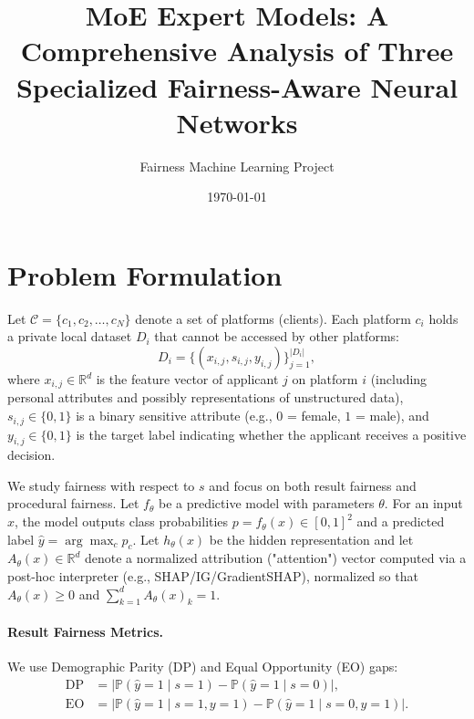 \documentclass[11pt]{article}
\title{MoE Expert Models: A Comprehensive Analysis of Three Specialized Fairness-Aware Neural Networks}
\author{Fairness Machine Learning Project}
\date{\today}
\begin{document}
\maketitle

\section{Problem Formulation}

Let $\mathcal{C} = \{c_1, c_2, \dots, c_N\}$ denote a set of platforms (clients). Each platform $c_i$ holds a private local dataset $D_i$ that cannot be accessed by other platforms:
\begin{equation}
    D_i = \{(x_{i,j}, s_{i,j}, y_{i,j})\}_{j=1}^{|D_i|},
\end{equation}
where $x_{i,j} \in \mathbb{R}^d$ is the feature vector of applicant $j$ on platform $i$ (including personal attributes and possibly representations of unstructured data), $s_{i,j} \in \{0,1\}$ is a binary sensitive attribute (e.g., $0$ = female, $1$ = male), and $y_{i,j} \in \{0,1\}$ is the target label indicating whether the applicant receives a positive decision.

We study fairness with respect to $s$ and focus on both result fairness and procedural fairness. Let $f_\theta$ be a predictive model with parameters $\theta$. For an input $x$, the model outputs class probabilities $p = f_\theta(x) \in [0,1]^2$ and a predicted label $\hat{y} = \arg\max_c p_c$. Let $h_\theta(x)$ be the hidden representation and let $A_\theta(x) \in \mathbb{R}^d$ denote a normalized attribution ("attention") vector computed via a post-hoc interpreter (e.g., SHAP/IG/GradientSHAP), normalized so that $A_\theta(x) \ge 0$ and $\sum_{k=1}^d A_\theta(x)_k = 1$.

\paragraph{Result Fairness Metrics.} We use Demographic Parity (DP) and Equal Opportunity (EO) gaps:
\begin{align}
    \text{DP} &= \left| \mathbb{P}(\hat{y}=1\mid s=1) - \mathbb{P}(\hat{y}=1\mid s=0) \right|, \\
    \text{EO} &= \left| \mathbb{P}(\hat{y}=1\mid s=1, y=1) - \mathbb{P}(\hat{y}=1\mid s=0, y=1) \right|.
\end{align}
\end{document}
